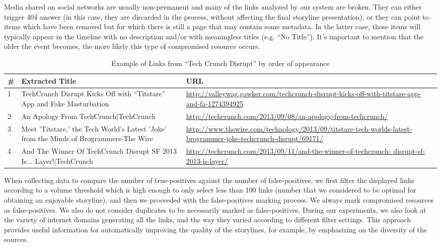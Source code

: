 \documentclass{sig-alternate}
\begin{document}
Media shared on social networks are usually non-permanent and many of the links analyzed by our system are broken. They can either trigger 404 answer (in this case, they are discarded in the process, without affecting the final storyline presentation), or they can point to items which have been removed but for which there is still a page that may contain some metadata. In the latter case, those items will typically appear in the timeline with no description and/or with meaningless titles (e.g. ``No Title''). It's important to mention that the older the event becomes, the more likely this type of compromised resource occurs.

\begin{table}[htbp]
\begin{tabular}{| p{0.2cm} | p{3.5cm} | p{3.8cm} |}
  \hline
  \textbf{\#} & \textbf{Extracted Title} & \textbf{URL} \\
  \hline
  1 & TechCrunch Disrupt Kicks Off with ``Titstare'' App and Fake Masturbation & \url{http://valleywag.gawker.com/techcrunch-disrupt-kicks-off-with-titstare-app-and-fa-1274394925} \\
\hline
  2 & An Apology From TechCrunch|TechCrunch & \url{http://techcrunch.com/2013/09/08/an-apology-from-techcrunch/} \\
\hline
  3 & Meet 'Titstare,' the Tech World's Latest 'Joke' from the Minds of Brogrammers-The Wire &\url{http://www.thewire.com/technology/2013/09/titstare-tech-worlds-latest-brogrammer-joke-techcrunch-disrupt/69171/} \\
\hline
  4 & And The Winner Of TechCrunch Disrupt SF 2013 Is... Layer!|TechCrunch &\url{http://techcrunch.com/2013/09/11/and-the-winner-of-techcrunch- disrupt-sf-2013-is-layer/} \\
\hline
\end{tabular}
\caption{Example of Links from ``Tech Crunch Disrupt'' by order of appearance}
\label{tab:tcdisrupt}
\end{table}

When collecting data to compare the number of true-positives against the number of false-positives, we first filter the displayed links according to a volume threshold which is high enough to only select less than 100 links (number that we considered to be optimal for obtaining an enjoyable storyline), and then we proceeded with the false-positives marking process. We always mark compromised resources as false-positives. We also do not consider duplicates to be necessarily marked as false-positives. During our experiments, we also look at the variety of internet domains generating all the links, and the way they varied according to different filter settings. This approach provides useful information for automatically improving the quality of the storylines, for example, by emphasizing on the diversity of the sources.
\end{document}
